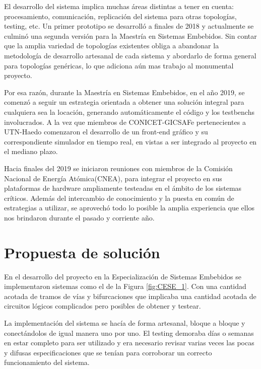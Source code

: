 		El desarrollo del sistema implica muchas áreas distintas a tener en cuenta: procesamiento, comunicación, replicación del sistema para otras topologías, testing, etc. Un primer prototipo se desarrolló a finales de 2018 y actualmente se culminó una segunda versión para la Maestría en Sistemas Embebidos. Sin contar que la amplia variedad de topologías existentes obliga a abandonar la metodología de desarrollo artesanal de cada sistema y abordarlo de forma general para topologías genéricas, lo que adiciona aún mas trabajo al monumental proyecto.		
		
		Por esa razón, durante la Maestría en Sistemas Embebidos, en el año 2019, se comenzó a seguir un estrategia orientada a obtener una solución integral para cualquiera sea la locación, generando automáticamente el código y los testbenchs involucrados. A la vez que miembros de CONICET-GICSAFe pertenecientes a UTN-Haedo comenzaron el desarrollo de un front-end gráfico y su correspondiente simulador en tiempo real, en vistas a ser integrado al proyecto en el mediano plazo.
	
		Hacia finales del 2019 se iniciaron reuniones con miembros de la Comisión Nacional de Energía Atómica(CNEA), para integrar el proyecto en sus plataformas de hardware ampliamente testeadas en el ámbito de los sistemas críticos. Además del intercambio de conocimiento y la puesta en común de estrategias a utilizar, se aprovechó todo lo posible la amplia experiencia que ellos nos brindaron durante el pasado y corriente año.
		
	\section{Propuesta de solución}	
		
		En el desarrollo del proyecto en la Especialización de Sistemas Embebidos se implementaron sistemas como el de la Figura \ref{fig:CESE_1}. Con una cantidad acotada de tramos de vías y bifurcaciones que implicaba una cantidad acotada de circuitos lógicos complicados pero posibles de obtener y testear.
		
		La implementación del sistema se hacía de forma artesanal, bloque a bloque y conectándolos de igual manera uno por uno. El testing demoraba días o semanas en estar completo para ser utilizado y era necesario revisar varias veces las pocas y difusas especificaciones que se tenían para corroborar un correcto funcionamiento del sistema.	
		
